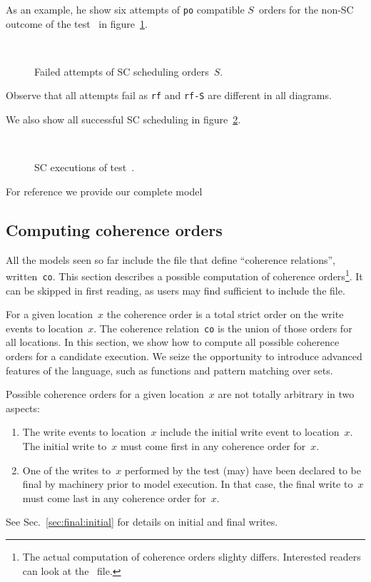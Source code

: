 As an example, he show six attempts of \texttt{po} compatible $S$~orders
for the non-SC outcome of the test~ in figure~\ref{sblamport}.
\begin{figure}[htp]
\caption{\label{sblamport}Failed attempts of SC scheduling orders~$S$.}
\begin{center}
\quad{}\quad{}\\
\quad{}\quad{}
\end{center}
\end{figure}
Observe that all attempts fail as \texttt{rf} and \texttt{rf-S}
are different in all diagrams.

We also show all successful SC scheduling in figure~\ref{sbok}.
\begin{figure}[htp]
\caption{\label{sbok}SC executions of test~.}
\begin{center}
\quad{}\quad{}\\
\quad{}\quad{}
\end{center}
\end{figure}


For reference we provide our complete model~


\subsection{Computing \label{sec:cos}coherence orders}
All the models seen so far include the
file  that define
``coherence relations'', written~\texttt{co}. This section describes
a possible computation of coherence orders\footnote{The actual computation of coherence orders slighty differs. Interested readers can look at the
~file.}. It can be skipped in first
reading, as users may find sufficient to include the file.

For a given location~$x$ the coherence order is a total strict order on the
write events to location~$x$. The coherence relation~\texttt{co} is the union
of those orders for all locations.
In this section, we show how to compute all possible coherence orders for
a candidate execution.
We seize the opportunity to introduce advanced features of the \cat{}
language, such as functions and pattern matching over sets.

Possible coherence orders for a given location~$x$
are not totally arbitrary in two aspects:
\begin{enumerate}
\item The write events to location~$x$ include
the initial write event to location~$x$.  The initial write to~$x$ must come
first in any coherence order for~$x$.
\item One of the writes to~$x$ performed by the test (may) have been declared
to be final by \herd{} machinery prior to model execution.
In that case, the final write to~$x$ must come last in any coherence order
for~$x$.
\end{enumerate}
See Sec.~\ref{sec:final:initial} for details on initial and final writes.

